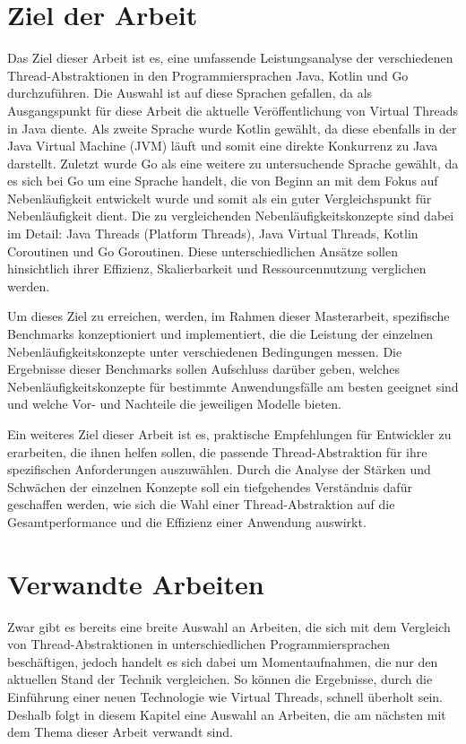 \documentclass[fontsize=12pt,paper=a4,twoside=semi,parskip=half-,headsepline,headinclude]{scrreprt}
\begin{document}
\section{Ziel der Arbeit}

Das Ziel dieser Arbeit ist es, eine umfassende Leistungsanalyse der verschiedenen Thread-Abstraktionen in den Programmiersprachen Java, Kotlin und Go durchzuführen. Die Auswahl ist auf diese Sprachen gefallen, da als Ausgangspunkt für diese Arbeit die aktuelle Veröffentlichung von Virtual Threads in Java diente. Als zweite Sprache wurde Kotlin gewählt, da diese ebenfalls in der Java Virtual Machine (JVM) läuft und somit eine direkte Konkurrenz zu Java darstellt. Zuletzt wurde Go als eine weitere zu untersuchende Sprache gewählt, da es sich bei Go um eine Sprache handelt, die von Beginn an mit dem Fokus auf Nebenläufigkeit entwickelt wurde und somit als ein guter Vergleichspunkt für Nebenläufigkeit dient. Die zu vergleichenden Nebenläufigkeitskonzepte sind dabei im Detail: Java Threads (Platform Threads), Java Virtual Threads, Kotlin Coroutinen und Go Goroutinen. Diese unterschiedlichen Ansätze sollen hinsichtlich ihrer Effizienz, Skalierbarkeit und Ressourcennutzung verglichen werden.

Um dieses Ziel zu erreichen, werden, im Rahmen dieser Masterarbeit, spezifische Benchmarks konzeptioniert und implementiert, die die Leistung der einzelnen Neben\-läufig\-keits\-konzepte unter verschiedenen Bedingungen messen. Die Ergebnisse dieser Benchmarks sollen Aufschluss darüber geben, welches Nebenläufigkeitskonzepte für bestimmte Anwendungsfälle am besten geeignet sind und welche Vor- und Nachteile die jeweiligen Modelle bieten.

Ein weiteres Ziel dieser Arbeit ist es, praktische Empfehlungen für Entwickler zu erarbeiten, die ihnen helfen sollen, die passende Thread-Abstraktion für ihre spezifischen Anforderungen auszuwählen. Durch die Analyse der Stärken und Schwächen der einzelnen Konzepte soll ein tiefgehendes Verständnis dafür geschaffen werden, wie sich die Wahl einer Thread-Abstraktion auf die Gesamtperformance und die Effizienz einer Anwendung auswirkt.

\section{Verwandte Arbeiten}

Zwar gibt es bereits eine breite Auswahl an Arbeiten, die sich mit dem Vergleich von Thread-Abstraktionen in unterschiedlichen Programmiersprachen beschäftigen, jedoch handelt es sich dabei um Momentaufnahmen, die nur den aktuellen Stand der Technik vergleichen. So können die Ergebnisse, durch die Einführung einer neuen Technologie wie Virtual Threads, schnell überholt sein. Deshalb folgt in diesem Kapitel eine Auswahl an Arbeiten, die am nächsten mit dem Thema dieser Arbeit verwandt sind.
\end{document}
